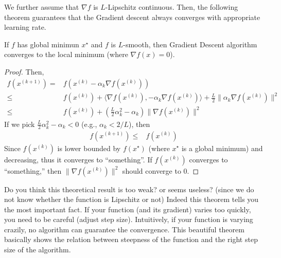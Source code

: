 \documentclass{article}
\begin{document}
We further assume that $\nabla f$ is $L$-Lipschitz continuous.
Then, the following theorem guarantees that the Gradient descent always converges with appropriate learning rate.
\begin{theorem}
    If $f$ has global minimun $x^\star$ and $f$ is $L$-smooth, then Gradient Descent algorithm converges to the local minimum (where $\nabla f(x) = 0$).
\end{theorem}

\begin{proof}
Then,
\begin{align}
    f(x^{(k+1)}) =& f(x^{(k)} - \alpha_k \nabla f(x^{(k)}))\\
    \leq& f(x^{(k)}) + \langle \nabla f(x^{(k)}), -\alpha_k \nabla f(x^{(k)})\rangle + \frac{L}{2} \|\alpha_k \nabla f(x^{(k)})\|^2\\
    \leq& f(x^{(k)}) + \left(\frac{L}{2}\alpha_k^2 - \alpha_k\right) \|\nabla f(x^{(k)})\|^2
\end{align}
If we pick $\frac{L}{2}\alpha_k ^2 - \alpha_k < 0 $ (e.g., $\alpha_k<2/L$), then
\begin{align}
    f(x^{(k+1)}) \leq& f(x^{(k)})
\end{align}
Since $f(x^{(k)})$ is lower bounded by $f(x^\star)$ (where $x^\star$ is a global minimum) and decreasing,
thus it converges to ``something''.
If $f(x^{(k)})$ converges to ``something,'' then $\|\nabla f(x^{(k)})\|^2$ should converge to 0.
\end{proof}


\begin{remark}
Do you think this theoretical result is too weak? or seems useless? 
(since we do not know whether the function is Lipschitz or not)
Indeed this theorem tells you the most important fact.
If your function (and its gradient) varies too quickly, you need to be careful (adjust step size).
Intuitively, if your function is varying crazily, no algorithm can guarantee the convergence.
This beautiful theorem basically shows the relation between steepness 
of the function and the right step size of the algorithm.
\end{remark}

% 
\end{document}

